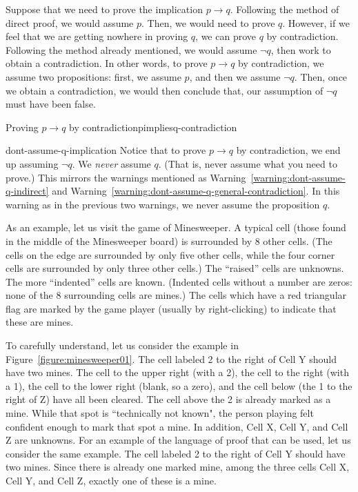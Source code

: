 \documentclass{book}
\theoremstyle{ekimcustom}
\begin{document}
Suppose that we need to prove the implication $p \to q$. Following the method of direct proof, we would assume $p$. Then, we would need to prove $q$. However, if we feel that we are getting nowhere in proving $q$, we can prove $q$ by contradiction. Following the method already mentioned, we would assume $\neg q$, then work to obtain a contradiction. In other words, to prove $p \to q$ by contradiction, we assume two propositions: first, we assume $p$, and then we assume $\neg q$. Then, once we obtain a contradiction, we would then conclude that, our assumption of $\neg q$ must have been false.
\begin{bmethod}{Proving $p \to q$ by contradiction}{pimpliesq-contradiction}
\begin{center}
\end{center}
\end{bmethod}
\begin{bwarning}{}{dont-assume-q-implication}
Notice that to prove $p \to q$ by contradiction, we end up assuming $\neg q$. We \emph{never} assume $q$. (That is, never assume what you need to prove.) This mirrors the warnings mentioned as Warning~\ref{warning:dont-assume-q-indirect} and Warning~\ref{warning:dont-assume-q-general-contradiction}. In this warning as in the previous two warnings, we never assume the proposition $q$.
\end{bwarning}

As an example, let us visit the game of Minesweeper. A typical cell (those found in the middle of the Minesweeper board) is surrounded by 8 other cells. (The cells on the edge are surrounded by only five other cells, while the four corner cells are surrounded by only three other cells.) The ``raised'' cells are unknowns. The more ``indented'' cells are known. (Indented cells without a number are zeros: none of the 8 surrounding cells are mines.) The cells which have a red triangular flag are marked by the game player (usually by right-clicking) to indicate that these are mines.

To carefully understand, let us consider the example in Figure~\ref{figure:minesweeper01}. The cell labeled 2 to the right of Cell Y should have two mines. The cell to the upper right (with a 2), the cell to the right (with a 1), the cell to the lower right (blank, so a zero), and the cell below (the 1 to the right of Z) have all been cleared. The cell above the 2 is already marked as a mine. While that spot is ``technically not known", the person playing felt confident enough to mark that spot a mine. In addition, Cell X, Cell Y, and Cell Z are unknowns. For an example of the language of proof that can be used, let us consider the same example. The cell labeled 2 to the right of Cell Y should have two mines. Since there is already one marked mine, among the three cells Cell X, Cell Y, and Cell Z, exactly one of these is a mine.
\end{document}
